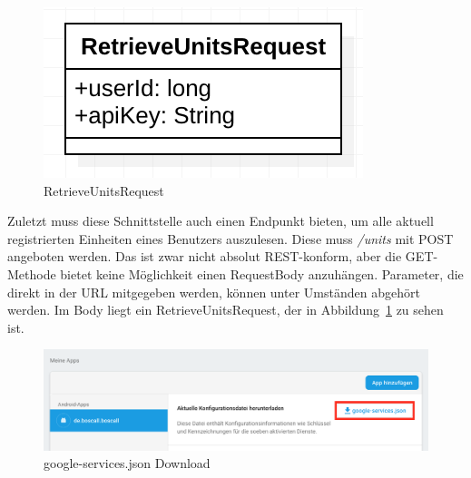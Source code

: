 \begin{figure}[h]
	\centering
	\includegraphics{include/img/retrieveunitsrequest}
	\caption{RetrieveUnitsRequest}
	\label{fig:retrieveUnitsRequest}
\end{figure}
Zuletzt muss diese Schnittstelle auch einen Endpunkt bieten, um alle aktuell registrierten Einheiten eines Benutzers auszulesen. Diese muss \textit{/units} mit POST angeboten werden. Das ist zwar nicht absolut REST-konform, aber die GET-Methode bietet keine Möglichkeit einen RequestBody anzuhängen. Parameter, die direkt in der URL mitgegeben werden, können unter Umständen abgehört werden. Im Body liegt ein RetrieveUnitsRequest, der in Abbildung~\ref{fig:retrieveUnitsRequest} zu sehen ist.

\begin{figure}
	\centering
	\includegraphics[width=\linewidth]{include/img/google-services-json}
	\caption{google-services.json Download}
	\label{fig:google-services-json-download}
\end{figure}

